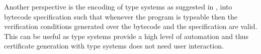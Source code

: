 
Another perspective is the encoding of  type systems as suggested in \cite{BeringerH06},  into
bytecode specification such that whenever the program is typeable then  the verification conditions generated over
the bytecode and the specification are valid. This can be useful as type
systems provide a high level of automation and thus certificate generation
with type systems does not need user interaction.  


